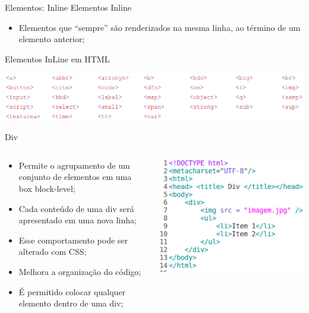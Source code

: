 \documentclass{beamer}
\begin{document}
\begin{frame}{Elementos: Inline}
  Elementos Inline
     \begin{itemize}
      \item Elementos que “sempre” são renderizados na mesma linha,
ao término de um elemento anterior;
     \end{itemize}
 
 Elementos InLine em HTML
 \vspace{0.3cm}
 \begin{center}
     \includegraphics[height=0.18\paperheight]{fig/aula1/html13.png}
   \end{center}
\end{frame}
\begin{frame}{Div}
  \begin{columns}
    \begin{column}{0.45 \textwidth}
      \small
     \begin{itemize}
       \item Permite o agrupamento de um conjunto de elementos em uma
box block-level;
       \item Cada conteúdo de uma div será apresentado em uma nova
linha;
       \item Esse comportamento pode ser alterado com CSS;
       \item Melhora a organização do código;
       \item É permitido colocar qualquer elemento dentro de uma div;
     \end{itemize}
    \end{column}
    
    \begin{column}{0.5\textwidth}
     \includegraphics[height=0.5\paperheight]{fig/aula1/html14.png}
    \end{column}
  \end{columns}
\end{frame}
\end{document}
